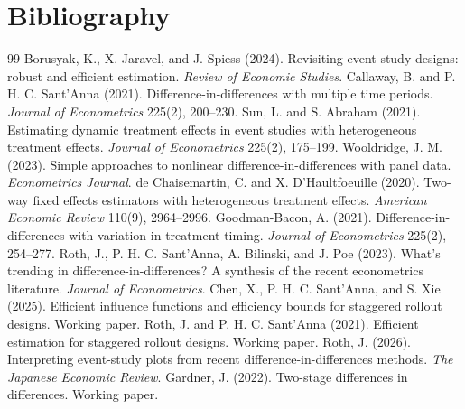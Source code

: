 \documentclass[11pt]{article}
\theoremstyle{definition}
\theoremstyle{plain}
\theoremstyle{remark}
\begin{document}
\section*{Bibliography}
\begin{thebibliography}{99}
 Borusyak, K., X. Jaravel, and J. Spiess (2024). Revisiting event-study designs: robust and efficient estimation. \textit{Review of Economic Studies}.
 Callaway, B. and P. H. C. Sant'Anna (2021). Difference-in-differences with multiple time periods. \textit{Journal of Econometrics} 225(2), 200--230.
 Sun, L. and S. Abraham (2021). Estimating dynamic treatment effects in event studies with heterogeneous treatment effects. \textit{Journal of Econometrics} 225(2), 175--199.
 Wooldridge, J. M. (2023). Simple approaches to nonlinear difference-in-differences with panel data. \textit{Econometrics Journal}.
 de Chaisemartin, C. and X. D'Haultfoeuille (2020). Two-way fixed effects estimators with heterogeneous treatment effects. \textit{American Economic Review} 110(9), 2964--2996.
 Goodman-Bacon, A. (2021). Difference-in-differences with variation in treatment timing. \textit{Journal of Econometrics} 225(2), 254--277.
 Roth, J., P. H. C. Sant'Anna, A. Bilinski, and J. Poe (2023). What's trending in difference-in-differences? A synthesis of the recent econometrics literature. \textit{Journal of Econometrics}.
 Chen, X., P. H. C. Sant'Anna, and S. Xie (2025). Efficient influence functions and efficiency bounds for staggered rollout designs. Working paper.
 Roth, J. and P. H. C. Sant'Anna (2021). Efficient estimation for staggered rollout designs. Working paper.
 Roth, J. (2026). Interpreting event-study plots from recent difference-in-differences methods. \textit{The Japanese Economic Review}.
 Gardner, J. (2022). Two-stage differences in differences. Working paper.
\end{thebibliography}
\end{document}

